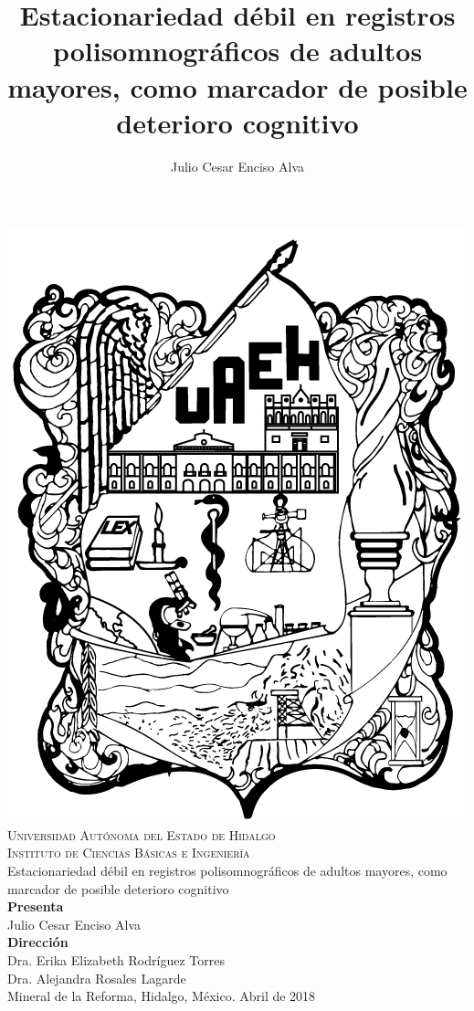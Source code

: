 \documentclass[12pt,letterpaper,draft]{book}
\begin{document}
\setcounter{page}{0}
\thispagestyle{empty}

\title{Estacionariedad débil en registros polisomnográficos de adultos mayores,
como marcador de posible deterioro cognitivo}
\author{Julio Cesar Enciso Alva}

\begin{center}
    \includegraphics[width=0.2\linewidth]{./img_oficiales/logo_uaeh.png}\\
    
    {\large 
        \textsc{
            Universidad Autónoma del Estado de Hidalgo\\
            Instituto de Ciencias Básicas e Ingeniería\\
        }
    }
\vspace*{2.5em}
    {\huge
        Estacionariedad débil en registros polisomnográficos de adultos mayores,
        como marcador de posible deterioro cognitivo\\
    }
\vspace*{2.5em}
    {\large
        \textbf{Presenta}\\
    }
\vspace*{.25em}
    {\Large
        Julio Cesar Enciso Alva\\
    }
\vspace*{3em}
    {\large
        \textbf{Dirección}\\
    }
\vspace*{.25em}
    {\Large
        Dra. Erika Elizabeth Rodríguez Torres\\
        Dra. Alejandra Rosales Lagarde\\
    }
\vspace*{3em}
    {\large
        Mineral de la Reforma, Hidalgo, México. Abril de 2018
    }
\end{center}

\newpage

\end{document}

